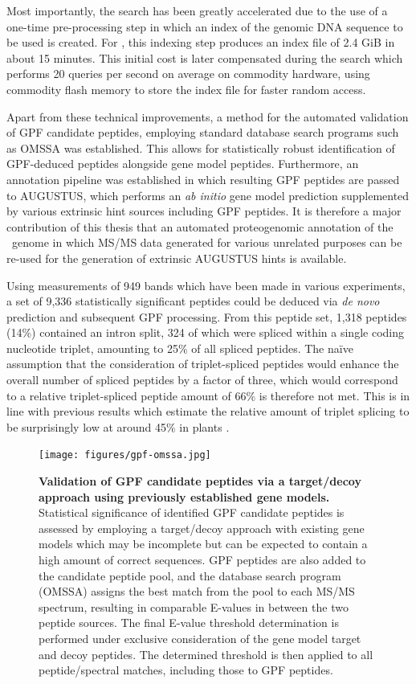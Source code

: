 Most importantly, the search has been greatly accelerated due to the use
of a one-time pre-processing step in which an index of the genomic DNA sequence
to be used is created.
For \cre, this indexing step produces an index file of 2.4 GiB in about 15 
minutes.
This initial cost is later compensated during the search which performs
20 queries per second on average on commodity hardware, using commodity flash 
memory to store the index file for faster random access.

Apart from these technical improvements, a method for the automated validation 
of GPF candidate peptides, employing standard database search programs such as 
OMSSA was established.
This allows for statistically robust identification of GPF-deduced peptides
alongside gene model peptides.
Furthermore, an annotation pipeline was established in which resulting GPF
peptides are passed to AUGUSTUS, which performs an {\em ab initio} gene 
model prediction supplemented by various extrinsic hint sources including
GPF peptides.
It is therefore a major contribution of this thesis that an automated
proteogenomic annotation of the \cre~genome in which MS/MS data generated
for various unrelated purposes can be re-used for the generation of
extrinsic AUGUSTUS hints is available.

Using measurements of 949 bands which have been made in various experiments,
a set of 9,336 statistically significant peptides could be deduced via 
{\em de novo} prediction and subsequent GPF processing.
From this peptide set, 1,318 peptides (14\%) contained an intron split,
324 of which were spliced within a single coding nucleotide triplet,
amounting to 25\% of all spliced peptides.
The na\"ive assumption that the consideration of triplet-spliced peptides
would enhance the overall number of spliced peptides by a factor of three,
which would correspond to a relative triplet-spliced peptide amount of 66\%
is therefore not met.
This is in line with previous results which estimate the relative amount
of triplet splicing to be surprisingly low at around 45\% in plants 
\citep{Tomita1996}.

\begin{figure}
\texttt{[image: figures/gpf-omssa.jpg]}
\caption{
{\bf Validation of GPF candidate peptides via a target/decoy approach
    using previously established gene models.} 
    Statistical significance of identified GPF candidate peptides is 
    assessed by employing a target/decoy approach with existing gene models 
    which may be incomplete but can be expected to contain a high amount of 
    correct sequences.
    GPF peptides are also added to the candidate peptide pool, and the database
    search program (OMSSA) assigns the best match from the pool to each
    MS/MS spectrum, resulting in comparable E-values in between the two
    peptide sources.
    The final E-value threshold determination is performed under exclusive
    consideration of the gene model target and decoy peptides.
    The determined threshold is then applied to all peptide/spectral matches,
    including those to GPF peptides.
}
\label{fig:gpf-omssa}
\end{figure}

